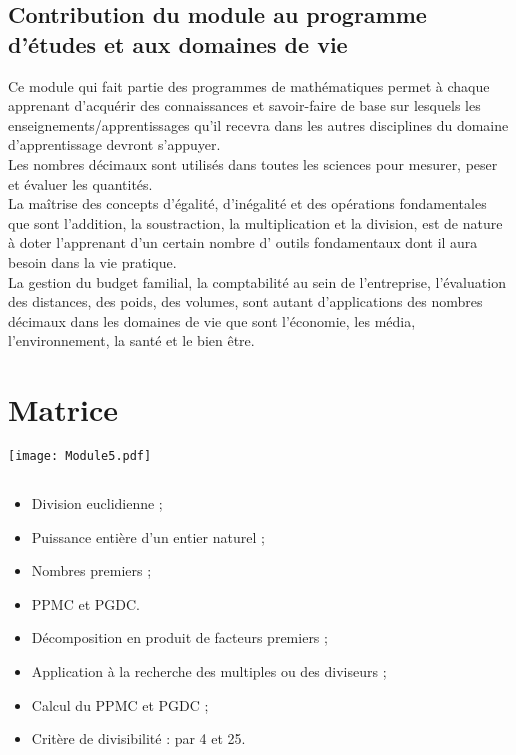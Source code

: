 \subsection{Contribution du module au programme d'études et aux domaines de vie}
Ce module qui fait partie des programmes de mathématiques permet à chaque apprenant d'acquérir des connaissances et savoir-faire de base sur lesquels les enseignements/apprentissages qu'il recevra dans les autres disciplines du domaine d'apprentissage devront s'appuyer.\\
Les nombres décimaux sont utilisés dans toutes les sciences pour mesurer, peser et évaluer les quantités.\\
La maîtrise des concepts d'égalité, d'inégalité et des opérations fondamentales que sont l'addition, la soustraction, la multiplication et la division, est de nature à doter l'apprenant d'un certain nombre d' outils fondamentaux dont il aura besoin dans la vie pratique.\\
La gestion du budget familial, la comptabilité au sein de l'entreprise, l'évaluation des distances, des poids, des volumes, sont autant d'applications des nombres décimaux dans les domaines de vie que sont l'économie, les média, l'environnement, la santé et le bien être.

\section{Matrice}

\texttt{[image: Module5.pdf]} 

\subsection*{}

\savoir
\begin{itemize}
\item Division euclidienne ;
\item Puissance entière d'un entier naturel ;
\item Nombres premiers ;
\item PPMC et PGDC.
\end{itemize}
\savoirfaire
\begin{itemize}
\item Décomposition en produit de facteurs premiers ;
\item Application à la recherche des multiples ou des diviseurs ;
\item Calcul du PPMC et PGDC ;
\item Critère de divisibilité : par 4 et 25.
\end{itemize}

